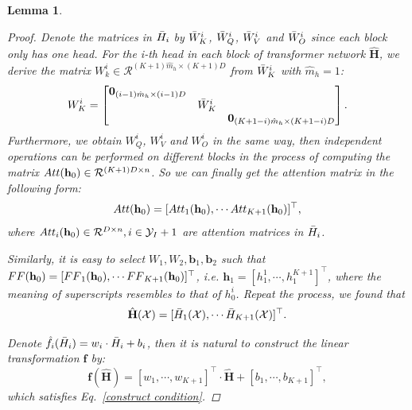 \documentclass{article}
\theoremstyle{plain}
\newtheorem{lemma}[theorem]{Lemma}
\theoremstyle{definition}
\theoremstyle{remark}
\begin{document}
\begin{lemma}
\begin{proof}
        Denote the matrices in $\Bar{H}_i$ by $\Bar{W}_K^i$, $\Bar{W}_Q^i$, $\Bar{W}_V^i$ and $\Bar{W}_O^i$ since each block only has one head. For the i-th head in each block of transformer network $\hat{\mathbf{H}}$, we derive the matrix $W_k^i \in \mathcal{R}^{(K+1)\hat{m}_h\times (K+1)D}$ from $\Bar{W}_K^i$ with $\hat{m}_h = 1$:
        \begin{equation}
            W_K^i = \begin{bmatrix}
                \mathbf{0}_{(i-1)\hat{m}_h \times (i-1)D} & &\\
                 &\Bar{W}_K^i &\\
                  &&\mathbf{0}_{(K+1-i)\hat{m}_h \times (K+1-i)D}
            \end{bmatrix}.
        \end{equation}
        Furthermore, we obtain $W_Q^i$, $W_V^i$ and $W_O^i$ in the same way, then independent operations can be performed on different blocks in the process of computing the matrix ${\rm Att}(\mathbf{h}_0) \in \mathcal{R}^{(K+1)D\times n}$.
        So we can finally get the attention matrix in the following form:
        \begin{equation}
            {\rm Att}(\mathbf{h}_0) = [{\rm Att}_1(\mathbf{h}_0),\cdots {\rm Att}_{K+1}(\mathbf{h}_0)]^{\top},
        \end{equation}
        where ${\rm Att}_i(\mathbf{h}_0) \in \mathcal{R}^{D\times n}, i \in \mathcal{Y}_I+1$ are attention matrices in $\Bar{H}_i$.

        Similarly, it is easy to select $W_1,W_2,\mathbf{b}_1,\mathbf{b}_2$ such that ${\rm FF}(\mathbf{h}_0) = [{\rm FF}_1(\mathbf{h}_0),\cdots {\rm FF}_{K+1}(\mathbf{h}_0)]^{\top}$, \textit{i}.\textit{e}. $\mathbf{h}_1=[h_1^1, \cdots, h_1^{K+1}]^{\top}$, where the meaning of superscripts resembles to that of $h_0^i$. Repeat the process, we found that 
        \begin{equation}
            \hat{\mathbf{H}}(\mathcal{X}) = [\Bar{H}_1(\mathcal{X}),\cdots \Bar{H}_{K+1}(\mathcal{X})]^{\top}.
        \end{equation}

        Denote $\hat{f}_i(\Bar{H}_i) = w_i\cdot \Bar{H}_i + b_i$, then it is natural to construct the linear transformation $\mathbf{f}$ by:
        \begin{equation}
            \mathbf{f}(\hat{\mathbf{H}}) = [w_1,\cdots,w_{K+1}]^{\top}\cdot \hat{\mathbf{H}} + [b_1,\cdots,b_{K+1}]^{\top},
        \end{equation}
        which satisfies Eq.~\eqref{construct condition}.


\end{proof}
\end{lemma}
\end{document}
